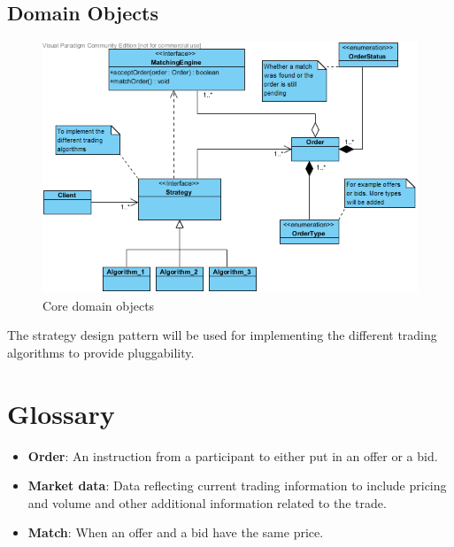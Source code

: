\documentclass[12pt]{article}
\begin{document}
		\subsection{Domain Objects}		  
			\begin{figure}[th]
			\centering
			\includegraphics[scale=0.8]{./domain_objects}
			\caption{Core domain objects}
			\label{domain objects}
			\end{figure}
								
			The strategy design pattern will be used for implementing the different trading algorithms to provide pluggability.
	\newpage				
	\section{Glossary}	
		\begin{itemize}
			\item \textbf{Order}: An instruction from a participant to either put in an offer or a bid.
			\item \textbf{Market data}: Data reflecting current trading information to include pricing and volume and other additional information related to the trade.
			\item \textbf{Match}: When an offer and a bid have the same price.
		\end{itemize}				    			    			    		
\end{document}
